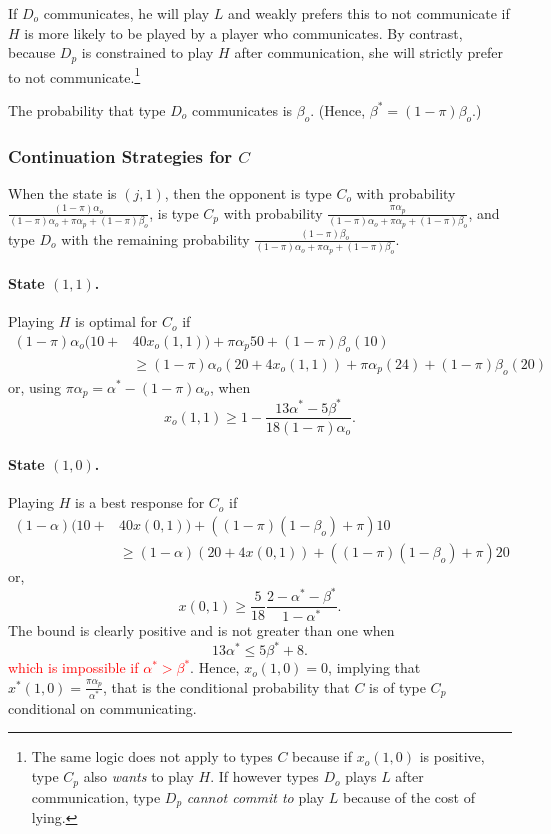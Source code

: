\documentclass[12pt]{article}
\theoremstyle{break}
\begin{document}
If $D_o$ communicates, he will play $L$ and weakly prefers this to not communicate if $H$ is more likely to be played by a player who communicates. By contrast, because $D_p$ is constrained to play $H$ after communication, she will strictly prefer to not communicate.\footnote{%
The same logic does not apply to types $C$ because if $x_o(1,0)$ is positive, type $C_p$ also \emph{wants} to play $H$. If however types $D_o$ plays $L$ after communication, type $D_p$ \emph{cannot commit to} play $L$ because of the cost of lying.} 


The probability that type $D_o$ communicates is $\beta_o$. (Hence, $\beta^*=(1-\pi)\beta_o$.)
%
\subsubsection*{Continuation Strategies for $C$}
When the state is $(j,1)$, then the opponent is type $C_o$ with probability $\frac{(1-\pi)\alpha_o}{(1-\pi)\alpha_o+\pi\alpha_p+(1-\pi)\beta_o}$, is type $C_p$ with probability $\frac{\pi\alpha_p}{(1-\pi)\alpha_o+\pi\alpha_p+(1-\pi)\beta_o}$, and type $D_o$ with the remaining probability $\frac{(1-\pi)\beta_o}{(1-\pi)\alpha_o+\pi\alpha_p+(1-\pi)\beta_o}$.

\paragraph{State $(1,1)$.} Playing $H$ is optimal for $C_o$ if
\[\begin{split}
	(1-\pi)\alpha_o (10+&40 x_o(1,1))+\pi \alpha_p 50+(1-\pi)\beta_o (10)\\
		&\geq (1-\pi)\alpha_o (20+4 x_o(1,1))+\pi \alpha_p (24)+(1-\pi)\beta_o (20)
\end{split}
\]
or, using $\pi\alpha_p=\alpha^*-(1-\pi)\alpha_o$, when
\begin{equation}\label{c50-x11}
	x_o(1,1)\geq 1-\frac{13\alpha^*-5\beta^*}{18(1-\pi)\alpha_o}.	
\end{equation}
%
\paragraph{State $(1,0)$.} Playing $H$ is a best response for $C_o$ if
\[\begin{split}
	(1-\alpha) (10+&40 x(0,1))+((1-\pi)(1-\beta_o)+\pi) 10\\
	&\geq (1-\alpha) (20+4 x(0,1))+((1-\pi)(1-\beta_o)+\pi) 20
\end{split}
\]
or,
\[
x(0,1)\geq \frac{5}{18}\frac{2-\alpha^*-\beta^*}{1-\alpha^*}.
\]
The bound is clearly positive and is not greater than one when 
\begin{equation*}
	13\alpha^* \leq  5\beta^*+8.
\end{equation*}
%
\textcolor{red}{which is impossible if $\alpha^*>\beta^*$}. Hence, $x_o(1,0)=0$, implying that $x^*(1,0)=\frac{\pi \alpha_p}{\alpha^*}$, that is the conditional probability that $C$ is of type $C_p$ conditional on communicating.
%							
\end{document}

